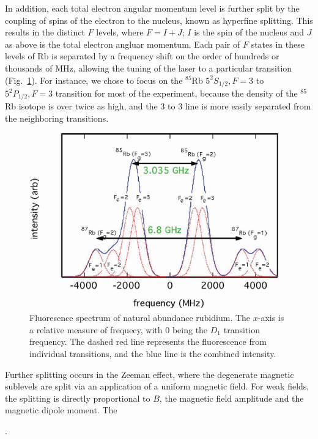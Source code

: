 In addition, each total electron angular momentum level is further
split by the coupling of spins of the electron to the nucleus, known
as hyperfine splitting. This results in the distinct $F$ levels, where
$F = I + J$; $I$ is the spin of the nucleus and $J$ as above is the
total electron angluar momentum. Each pair of $F$ states in these
levels of Rb is separated by a frequency shift on the order of
hundreds or thousands of MHz, allowing the tuning of the laser to a
particular transition (Fig.~\ref{fig:fluor}). For instance, we
chose to focus on the $^{85}$Rb $5^2S_{1/2}, F = 3$ to $5^2P_{1/2}, F
= 3$ transition for most of the experiment, because the density of the
$^{85}$Rb isotope is over twice as high, and the $3$ to $3$ line is
more easily separated from the neighboring transitions.

\begin{figure}[h]
\begin{center}
\includegraphics[height=3in]{figures/fluorescence.eps}
\caption{\small{Fluoresence spectrum of natural abundance rubidium. The $x$-axis is a relative measure of frequecy, with $0$ being the $D_1$ transition frequency. The dashed red line represents the fluorescence from individual transitions, and the blue line is the combined intensity.}}
\label{fig:fluor}
\end{center}
\end{figure}

Further splitting occurs in the Zeeman effect, where the degenerate
magnetic sublevels are split via an application of a uniform magnetic
field. For weak fields, the splitting is directly proportional to $B$,
the magnetic field amplitude and the magnetic dipole moment. The 

\begin{equation}
\end{equation}
\cite{griffiths}. 

